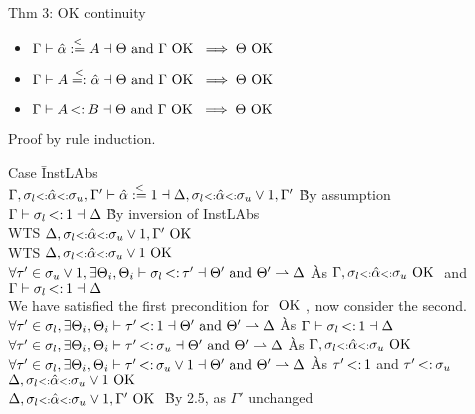 \documentclass{report}
\begin{document}
Thm 3: OK continuity
\begin{itemize}
\item $\Gamma \vdash \hat{\alpha} \overset{<}{:=} A \dashv \Theta \text{ and } \Gamma \text{ OK } \implies \Theta \text{ OK }$
\item $\Gamma \vdash A \overset{<}{=:} \hat{\alpha} \dashv \Theta \text{ and } \Gamma \text{ OK } \implies \Theta \text{ OK }$
\item $\Gamma \vdash A \st B \dashv \Theta \text{ and } \Gamma \OK \implies \Theta \OK$
\end{itemize}
Proof by rule induction.
\begin{tabbing}
Case \=InstLAbs\\
\>$\Gamma,\sigma_{l} {\scriptstyle{<:}} \hat{\alpha} {\scriptstyle{<:}} \sigma_{u},\Gamma' \vdash \hat{\alpha} \overset{<}{:=} 1 \dashv \Delta,\sigma_{l} {\scriptstyle{<:}} \hat{\alpha} {\scriptstyle{<:}} \sigma_{u} \vee 1,\Gamma'$ \` By assumption\\
\>$\Gamma \vdash \botbound \st 1 \dashv \Delta$ \` By inversion of InstLAbs\\
\>WTS $\Delta,\sigma_{l} {\scriptstyle{<:}} \hat{\alpha} {\scriptstyle{<:}} \sigma_{u}\vee 1,\Gamma' \text{ OK }$\\
\>WTS $\Delta,\sigma_{l} {\scriptstyle{<:}} \hat{\alpha} {\scriptstyle{<:}} \sigma_{u}\vee 1 \text{ OK }$\\
\>$\forall \tau' \in \topbound \vee 1, \exists \Theta_i, \Theta_i \vdash \botbound \st \tau' \dashv \Theta' \text{ and } \Theta' \contracts \Delta$ \` As $\Gamma,\sigma_{l} {\scriptstyle{<:}} \hat{\alpha} {\scriptstyle{<:}} \sigma_{u} \text{ OK }$ and $\Gamma \vdash \botbound \st 1 \dashv \Delta$\\
\>We have satisfied the first precondition for $\text{ OK }$, now consider the second.\\
\>$\forall \tau' \in \botbound, \exists \Theta_i, \Theta_i \vdash \tau' \st 1\dashv \Theta' \text{ and } \Theta' \contracts \Delta$ \` As $\Gamma \vdash \botbound \st 1 \dashv \Delta$\\
\>$\forall \tau' \in \botbound, \exists \Theta_i, \Theta_i \vdash \tau' \st \topbound\dashv \Theta' \text{ and } \Theta' \contracts \Delta$ \`  As $\Gamma,\sigma_{l} {\scriptstyle{<:}} \hat{\alpha} {\scriptstyle{<:}} \sigma_{u} \text{ OK }$\\
\>$\forall \tau' \in \botbound, \exists \Theta_i, \Theta_i \vdash \tau' \st \topbound \vee 1\dashv \Theta' \text{ and } \Theta' \contracts \Delta$ \` As $\tau' \st 1$ and $\tau' \st \topbound$\\
\>$\Delta,\sigma_{l} {\scriptstyle{<:}} \hat{\alpha} {\scriptstyle{<:}} \sigma_{u}\vee 1 \text{ OK }$\\
\>$\Delta,\sigma_{l} {\scriptstyle{<:}} \hat{\alpha} {\scriptstyle{<:}} \sigma_{u}\vee 1,\Gamma' \text{ OK }$ \` By 2.5, as $\Gamma'$ unchanged\\

\end{tabbing}
\end{document}
